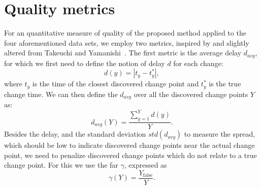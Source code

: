 \section{Quality metrics}\label{sec:artificial_data_quality_metrics}
For an quantitative measure of quality of the proposed method applied to the four aforementioned data sets, we employ two metrics, inspired by and slightly altered from Takeuchi and Yamanishi~\cite{takeuchi2006unifying}.
The first metric is the average delay $d_{avg}$, for which we first need to define the notion of delay $d$ for each change:
\begin{equation}\label{eq:delay}
  d(y) = |t_y - t_y^*|,
\end{equation}
where $t_y$ is the time of the closest discovered change point and $t_y^*$ is the true change time.
We can then define the $d_{avg}$ over all the discovered change points $Y$ as:
\begin{equation}\label{eq:average_delay}
  d_{avg}(Y) = \frac{\sum_{y=1}^Y d(y)}{Y}.
\end{equation}
Besides the delay, and the standard deviation $std(d_{avg})$ to measure the spread, which should be low to indicate discovered change points near the actual change point, we need to penalize discovered change points which do not relate to a true change point.
For this we use the \acrlong{far} $\gamma$, expressed as
\begin{equation}\label{eq:false_alarm_rate}
  \gamma(Y) = \frac{Y_{\operatorname*{false}}}{Y}.
\end{equation}

